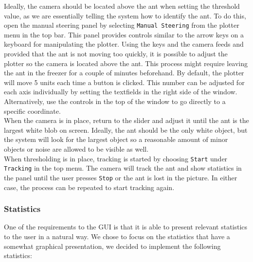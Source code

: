 Ideally, the camera should be located above the ant when setting the threshold value, as we are essentially telling the system how to identify the ant. To do this, open the manual steering panel by selecting \texttt{Manual Steering} from the plotter menu in the top bar. This panel provides controls similar to the arrow keys on a keyboard for manipulating the plotter. Using the keys and the camera feeds and provided that the ant is not moving too quickly, it is possible to adjust the plotter so the camera is located above the ant. This process might require leaving the ant in the freezer for a couple of minutes beforehand. By default, the plotter will move 5 units each time a button is clicked. This number can be adjusted for each axis individually by setting the textfields in the right side of the window. Alternatively, use the controls in the top of the window to go directly to a specific coordinate. \\

When the camera is in place, return to the slider and adjust it until the ant is the largest white blob on screen. Ideally, the ant should be the only white object, but the system will look for the largest object so a reasonable amount of minor objects or noise are allowed to be visible as well. \\

When thresholding is in place, tracking is started by choosing \texttt{Start} under \texttt{Tracking} in the top menu. The camera will track the ant and show statistics in the panel until the user presses \texttt{Stop} or the ant is lost in the picture. In either case, the process can be repeated to start tracking again.



\subsubsection{Statistics} \mbox{}\par
One of the requirements to the GUI is that it is able to present relevant statistics to the user in a natural way. We chose to focus on the statistics that have a somewhat graphical presentation, we decided to implement the following statistics:


